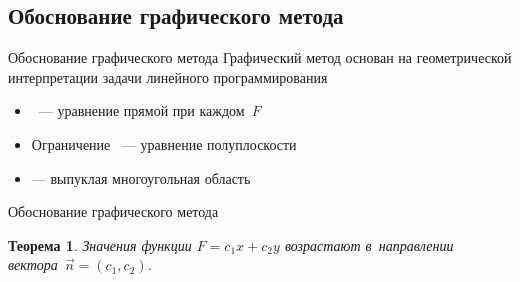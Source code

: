 \documentclass[unicode,11pt,notheorems]{beamer}
\newtheorem{theorem}{Теорема}
\begin{document}
\subsection{Обоснование графического метода}
\begin{frame}{Обоснование графического метода}{}
   Графический метод основан на геометрической интерпретации задачи линейного программирования
   \begin{itemize}
		\item {}~--- уравнение прямой при каждом~$F$
		\item Ограничение ~--- уравнение полуплоскости
		\item {} --- выпуклая многоугольная область
   \end{itemize}
\end{frame} 

\begin{frame}{Обоснование графического метода}{}
\begin{theorem}
Значения функции $F=c_1 x+c_2 y$ возрастают в~направлении вектора~$\vec{n}=(c_1,c_2)$.
\end{theorem}
\end{frame} 
\end{document}

